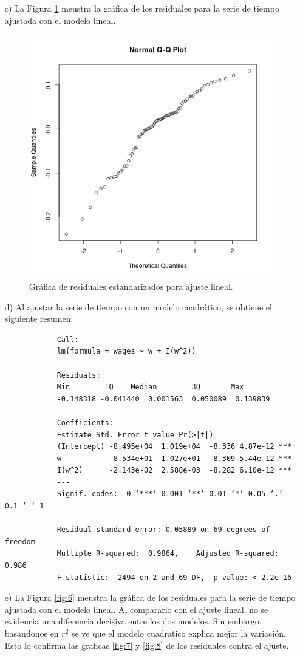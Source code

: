 \documentclass[11pt,letterpaper]{article}
\begin{document}
\begin{itemize}
		\item[c)] La Figura \ref{fig:5} meustra la gráfica de los residuales para la serie de tiempo ajustada con el modelo lineal.
		
		\begin{figure}[!h]
			\centering
			\includegraphics[width=0.6\linewidth]{../img/qqnorm_linear.png}
			\caption{Gráfica de residuales estandarizados para ajuste lineal.}
			\label{fig:5}
		\end{figure}
		
		\item[d)] Al ajustar la serie de tiempo con un modelo cuadrático, se obtiene el siguiente resumen:
		
		\begin{verbatim}
			Call:
			lm(formula = wages ~ w + I(w^2))
			
			Residuals:
			Min        1Q    Median        3Q       Max 
			-0.148318 -0.041440  0.001563  0.050089  0.139839 
			
			Coefficients:
			Estimate Std. Error t value Pr(>|t|)    
			(Intercept) -8.495e+04  1.019e+04  -8.336 4.87e-12 ***
			w            8.534e+01  1.027e+01   8.309 5.44e-12 ***
			I(w^2)      -2.143e-02  2.588e-03  -8.282 6.10e-12 ***
			---
			Signif. codes:  0 ‘***’ 0.001 ‘**’ 0.01 ‘*’ 0.05 ‘.’ 0.1 ‘ ’ 1
			
			Residual standard error: 0.05889 on 69 degrees of freedom
			Multiple R-squared:  0.9864,    Adjusted R-squared:  0.986 
			F-statistic:  2494 on 2 and 69 DF,  p-value: < 2.2e-16
		\end{verbatim}
		
		\item[e)] La Figura \ref{fig:6} meustra la gráfica de los residuales para la serie de tiempo ajustada con el modelo lineal. Al compararlo con el ajuste lineal, no se evidencia una diferencia decisiva entre los dos modelos. Sin embargo, basandonos en $r^2$ se ve que el modelo cuadratico explica mejor la variación. Esto lo confirma las graficas \ref{fig:7} y \ref{fig:8} de los residuales contra el ajuste.
		

\end{itemize}
\end{document}
